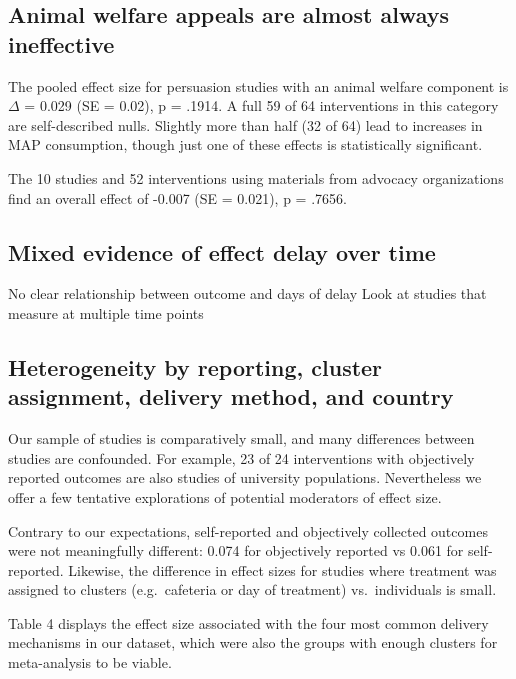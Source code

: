 \documentclass[sn-nature,pdflatex]{sn-jnl}
\begin{document}
\subsection{Animal welfare appeals are almost always
ineffective}\label{sec2.8}

The pooled effect size for persuasion studies with an animal welfare
component is \(\Delta\) = 0.029 (SE = 0.02), p = .1914. A full 59 of 64
interventions in this category are self-described nulls. Slightly more
than half (32 of 64) lead to increases in MAP consumption, though just
one of these effects is statistically significant.

The 10 studies and 52 interventions using materials from advocacy
organizations find an overall effect of -0.007 (SE = 0.021), p = .7656.

\subsection{Mixed evidence of effect delay over
time}\label{mixed-evidence-of-effect-delay-over-time}

No clear relationship between outcome and days of delay Look at studies
that measure at multiple time points

\subsection{Heterogeneity by reporting, cluster assignment, delivery
method, and country}\label{sec2.10}

Our sample of studies is comparatively small, and many differences
between studies are confounded. For example, 23 of 24 interventions with
objectively reported outcomes are also studies of university
populations. Nevertheless we offer a few tentative explorations of
potential moderators of effect size.

Contrary to our expectations, self-reported and objectively collected
outcomes were not meaningfully different: 0.074 for objectively reported
vs 0.061 for self-reported. Likewise, the difference in effect sizes for
studies where treatment was assigned to clusters (e.g.~cafeteria or day
of treatment) vs.~individuals is small.

Table 4 displays the effect size associated with the four most common
delivery mechanisms in our dataset, which were also the groups with
enough clusters for meta-analysis to be viable.
\end{document}
